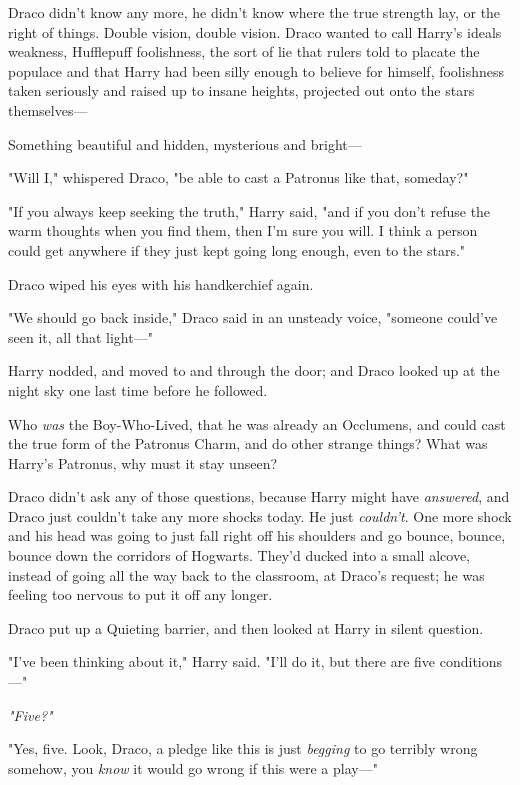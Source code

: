 Draco didn't know any more, he didn't know where the true strength lay, or the
right of things. Double vision, double vision. Draco wanted to call Harry's
ideals weakness, Hufflepuff foolishness, the sort of lie that rulers told to
placate the populace and that Harry had been silly enough to believe for
himself, foolishness taken seriously and raised up to insane heights, projected
out onto the stars themselves---

Something beautiful and hidden, mysterious and bright---

"Will I," whispered Draco, "be able to cast a Patronus like that, someday?"

"If you always keep seeking the truth," Harry said, "and if you don't refuse
the warm thoughts when you find them, then I'm sure you will. I think a person
could get anywhere if they just kept going long enough, even to the stars."

Draco wiped his eyes with his handkerchief again.

"We should go back inside," Draco said in an unsteady voice, "someone could've
seen it, all that light\mbox{---}"

Harry nodded, and moved to and through the door; and Draco looked up at the
night sky one last time before he followed.

Who \emph{was} the Boy-Who-Lived, that he was already an Occlumens, and could
cast the true form of the Patronus Charm, and do other strange things? What was
Harry's Patronus, why must it stay unseen?

Draco didn't ask any of those questions, because Harry might have
\emph{answered}, and Draco just couldn't take any more shocks today. He just
\emph{couldn't}. One more shock and his head was going to just fall right off
his shoulders and go bounce, bounce, bounce down the corridors of Hogwarts.
\sbreak
They'd ducked into a small alcove, instead of going all the way back to the
classroom, at Draco's request; he was feeling too nervous to put it off any
longer.

Draco put up a Quieting barrier, and then looked at Harry in silent question.

"I've been thinking about it," Harry said. "I'll do it, but there are five
conditions\mbox{---}"

\emph{"Five?"}

"Yes, five. Look, Draco, a pledge like this is just \emph{begging} to go
terribly wrong somehow, you \emph{know} it would go wrong if this were a
play\mbox{---}"

